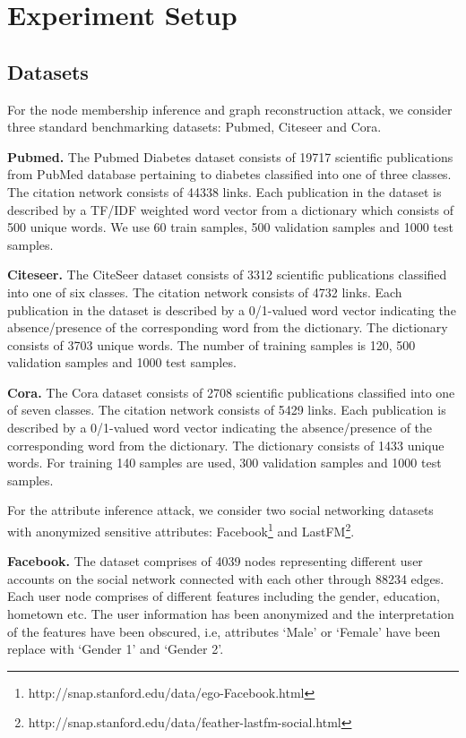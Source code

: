 \section{Experiment Setup}\label{setup}


\subsection{Datasets}

For the node membership inference and graph reconstruction attack, we consider three standard benchmarking datasets: Pubmed, Citeseer and Cora.

\noindent\textbf{Pubmed.} The Pubmed Diabetes dataset consists of 19717 scientific publications from PubMed database pertaining to diabetes classified into one of three classes. The citation network consists of 44338 links. Each publication in the dataset is described by a TF/IDF weighted word vector from a dictionary which consists of 500 unique words.
We use 60 train samples, 500 validation samples and 1000 test samples.

\noindent\textbf{Citeseer.} The CiteSeer dataset consists of 3312 scientific publications classified into one of six classes.
The citation network consists of 4732 links. Each publication in the dataset is described by a 0/1-valued word vector indicating the absence/presence of the corresponding word from the dictionary.
The dictionary consists of 3703 unique words.
The number of training samples is 120, 500 validation samples and 1000 test samples.

\noindent\textbf{Cora.} The Cora dataset consists of 2708 scientific publications classified into one of seven classes.
The citation network consists of 5429 links. Each publication is described by a 0/1-valued word vector indicating the absence/presence of the corresponding word from the dictionary.
The dictionary consists of 1433 unique words.
For training 140 samples are used, 300 validation samples and 1000 test samples.

For the attribute inference attack, we consider two social networking datasets with anonymized sensitive attributes: Facebook\footnote{http://snap.stanford.edu/data/ego-Facebook.html} and LastFM\footnote{http://snap.stanford.edu/data/feather-lastfm-social.html}.

\noindent\textbf{Facebook.} The dataset comprises of 4039 nodes representing different user accounts on the social network connected with each other through 88234 edges.
Each user node comprises of different features including the gender, education, hometown etc.
The user information has been anonymized and the interpretation of the features have been obscured, i.e, attributes `Male' or `Female' have been replace with `Gender 1' and `Gender 2'.

